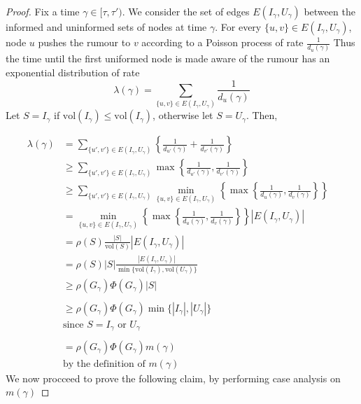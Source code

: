 \documentclass[a4paper,11pt]{article}
\theoremstyle{definition}
\begin{document}
\begin{proof}
	Fix a time $\gamma \in [\tau, \tau')$. 
	We consider the set of edges $E(I_\gamma, U_\gamma)$ between the informed and uninformed sets of nodes at time $\gamma$. 
	For every $\{u, v\} \in E(I_\gamma, U_\gamma)$, node $u$ pushes the rumour to $v$ according to a Poisson process of rate $\frac{1}{d_u(\gamma)}$ %
	Thus the time until the first uniformed node is made aware of the rumour has an exponential distribution of rate %
	$$
		\lambda(\gamma) = \sum_{\{u, v\} \in E(I_\gamma, U_\gamma)} \frac{1}{d_u(\gamma)}
	$$
	Let $S = I_\gamma$ if $\text{vol}(I_\gamma) \leq \text{vol}(I_\gamma)$, otherwise let $S = U_\gamma$. Then,

	\begin{align*}
		\lambda(\gamma) &= \sum_{\{u', v'\} \in E(I_\gamma, U_\gamma)} \left\{ \frac{1}{d_{u'}(\gamma)} + \frac{1}{d_{v'}(\gamma)} \right\}\\
		& \geq \sum_{\{u', v'\} \in E(I_\gamma, U_\gamma)}  \max \left\{ \frac{1}{d_{u'}(\gamma)},\frac{1}{d_{v'}(\gamma)} \right\} \\ 
		& \geq \sum_{\{u', v'\} \in E(I_\gamma, U_\gamma)} \min_{\{u, v\} \in E(I_\gamma, U_\gamma) } \left\{ \max \left\{ \frac{1}{d_u(\gamma)},\frac{1}{d_v(\gamma)} \right\} \right\} & \\ 
		& = \min_{\{u, v\} \in E(I_\gamma, U_\gamma) } 
		\left\{ \max \left\{ \frac{1}{d_u(\gamma)},\frac{1}{d_v(\gamma)} \right\} \right\} |E(I_\gamma, U_\gamma)| \\
		& = \rho(S) \frac{|S|}{\text{vol}(S)} |E(I_\gamma, U_\gamma)| \\
		& = \rho(S) |S| \frac{|E(I_\gamma, U_\gamma)|}{ 
			\min\{\text{vol}(I_\gamma), \text{vol}(U_\gamma)\}
		} \\
		& \geq \rho(G_\gamma)\Phi(G_\gamma)|S| \\ 
		& \\
		& \geq \rho(G_\gamma)\Phi(G_\gamma) \min\{|I_\gamma|, |U_\gamma|\} \\
		& \text{since } S = I_\gamma \text { or } U_\gamma \\
		& \\
		& = \rho(G_\gamma)\Phi(G_\gamma) m(\gamma) \\
		& \text{by the definition of } m(\gamma)
	\end{align*}
	We now procceed to prove the following claim, by performing case analysis on $m(\gamma)$


\end{proof}
\end{document}
